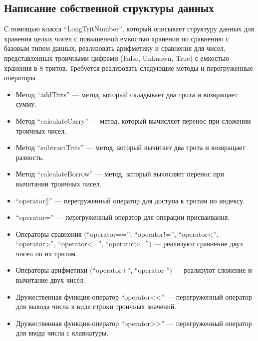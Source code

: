 \documentclass[12pt, a4paper]{article}
\begin{document}
\subsection{Написание собственной структуры данных}
С помощью класса ``LongTritNumber'', который описывает структуру данных для хранения целых чисел с повышенной емкостью хранения по сравнению с базовым типом данных, реализовать арифметику и сравнения для чисел, представленных троичными цифрами (False, Unknown, True) с емкостью хранения в 8 тритов. Требуется реализовать следующие методы и перегруженные операторы.
\begin{itemize}
    \item[---] Метод ``addTrits'' --- метод, который складывает два трита и возвращает сумму.
    \item[---] Метод ``calculateCarry'' --- метод, который вычисляет перенос при сложении троичных чисел.
    \item[---] Метод ``subtractTrits'' --- метод, который вычитает два трита и возвращает разность.
    \item[---] Метод ``calculateBorrow'' --- метод, который вычисляет перенос при вычитании троичных чисел.
    \item[---] ``operator[]'' --- перегруженный оператор для доступа к тритам по индексу.
    \item[---] ``operator='' --- перегруженный оператор для операции присваивания.
    \item[---] Операторы сравнения (``operator=='', ``operator!='', ``operator<'', ``operator>'', ``operator<='', ``operator>='') --- реализуют сравнение двух чисел по их тритам.
    \item[---] Операторы арифметики (``operator+'', ``operator-'') --- реализуют сложение и вычитание двух чисел.
    \item[---] Дружественная функция-оператор ``operator<<'' --- перегруженный оператор для вывода числа в виде строки троичных значений.
    \item[---] Дружественная функция-оператор ``operator>>'' --- перегруженный оператор для ввода числа с клавиатуры.
\end{itemize}
\end{document}
